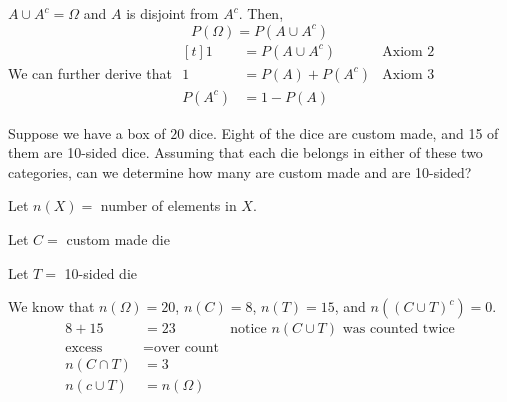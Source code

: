 \begin{proposition}
    $A \cup A^c = \Omega$ and $A$ is disjoint from $A^c$. Then, $$P(\Omega) = P(A \cup A^c)$$
    We can further derive that $\begin{aligned}[t]
            1      & = P(A \cup A^c) & \text{Axiom 2} \\
            1      & = P(A) + P(A^c) & \text{Axiom 3} \\
            P(A^c) & = 1 - P(A)
        \end{aligned}$
\end{proposition}

\begin{example}
    Suppose we have a box of $20$ dice. Eight of the dice are custom made, and 15 of them are 10-sided dice. Assuming that each die belongs in either of these two categories, can we determine how many are custom made and are 10-sided?

    Let $n(X) =$ number of elements in $X$.

    Let $C =$ custom made die

    Let $T =$ 10-sided die

    We know that $n(\Omega) = 20$, $n(C) = 8$, $n(T) = 15$, and $n((C \cup T)^c) = 0$.
    \begin{align*}
        8 + 15        & = 23                & \text{notice } n(C \cup T) \text{ was counted twice} \\
        \text{excess} & = \text{over count}                                                        \\
        n(C \cap T)   & = 3                                                                        \\
        n(c \cup T)   & = n(\Omega)
    \end{align*}
\end{example}

